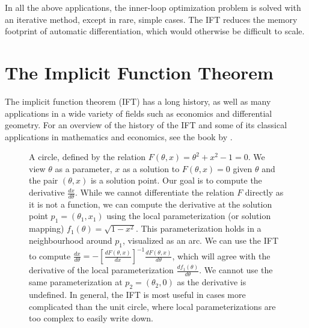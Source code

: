 \documentclass[11pt]{article}
\begin{document}
In all the above applications, the inner-loop optimization problem is solved
with an iterative method, except in rare, simple cases.
The IFT reduces the memory footprint of automatic differentiation,
which would otherwise be difficult to scale.

\section{The Implicit Function Theorem}
The implicit function theorem (IFT) has a long history, as well as many applications
in a wide variety of fields such as economics and differential geometry.
For an overview of the history of the IFT and some of its classical applications
in mathematics and economics,
see the book by \citet{iftbook}.

\begin{figure}
\centering
{}
\caption{
\label{fig:circle}
A circle, defined by the relation $F(\theta,x) = \theta^2 + x^2 - 1 = 0$.
We view $\theta$ as a parameter, $x$ as a solution to $F(\theta,x)=0$ given $\theta$
and the pair $(\theta,x)$ is a solution point.
Our goal is to compute the derivative $\frac{dx}{d\theta}$.
While we cannot differentiate the relation $F$ directly as it is not a function,
we can compute the derivative at the solution point $p_1 = (\theta_1,x_1)$
using the local parameterization (or solution mapping) $f_1(\theta)=\sqrt{1-x^2}$.
This parameterization holds
in a neighbourhood around $p_1$, visualized as an arc.
We can use the IFT to compute
$\frac{dx}{d\theta}= -\left[\frac{dF(\theta,x)}{dx}\right]^{-1}\frac{dF(\theta,x)}{d\theta}$,
which will agree with the derivative of the local parameterization
$\frac{df_1(\theta)}{d\theta}$.
We cannot use the same parameterization at $p_2 = (\theta_2, 0)$ as the derivative is undefined.
In general, the IFT is most useful in cases more complicated than the unit circle,
where local parameterizations are too complex to easily write down.
}
\end{figure}
\end{document}
